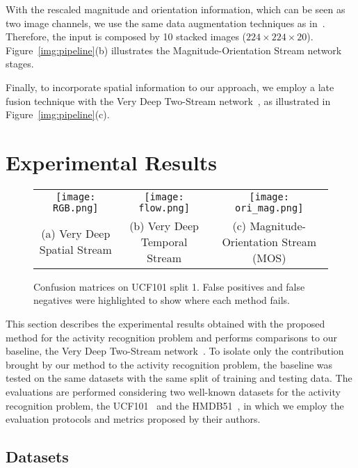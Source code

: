 \documentclass[10pt,conference]{IEEEtran}
\begin{document}
With the rescaled magnitude and orientation information, which can be seen as two image channels, we use the same data augmentation techniques as in~\cite{Wang:2015}. Therefore, the input is composed by 10 stacked images ($224\times224\times20$). Figure~\ref{img:pipeline}(b) illustrates the Magnitude-Orientation Stream network stages.

Finally, to incorporate spatial information to our approach, we employ a late fusion technique with the Very Deep Two-Stream network~\cite{Wang:2015}, as illustrated in Figure~\ref{img:pipeline}(c).

%
\section{Experimental Results}\label{experiments}

\begin{figure*}[!htb]
	\centering
	\begin{tabular}{ccc}
		\texttt{[image: RGB.png]} & \texttt{[image: flow.png]} & \texttt{[image: ori\_mag.png]}\\
		\footnotesize{(a) Very Deep Spatial Stream} & \footnotesize{(b) Very Deep Temporal Stream} & \footnotesize{(c) Magnitude-Orientation Stream (MOS)}\\
	\end{tabular}
	\caption{Confusion matrices on UCF101 split 1. False positives and false negatives were highlighted to show where each method fails.}
	\label{img:confusion_matrices}
\end{figure*}

This section describes the experimental results obtained with the proposed method for the activity recognition problem and performs comparisons to our baseline, the Very Deep Two-Stream network~\cite{Wang:2015}. To isolate only the contribution brought by our method to the activity recognition problem, the baseline was tested on the same datasets with the same split of training and testing data. The evaluations are performed considering two well-known datasets for the activity recognition problem, the UCF101~\cite{Soomro:2012} and the HMDB51~\cite{Kuehne:2011}, in which we employ the evaluation protocols and metrics proposed by their authors.

\subsection{Datasets}
\end{document}
